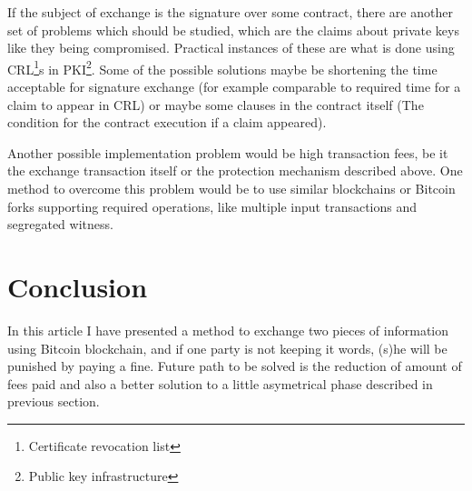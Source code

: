 \documentclass[]{article}
\begin{document}
If the subject of exchange is the signature over some contract, there are another set of problems which should be studied, which are the claims about private keys like they being compromised. Practical instances of these are what is done using CRL\footnote{Certificate revocation list}s in PKI\footnote{Public key infrastructure}. Some of the possible solutions maybe be shortening the time acceptable for signature exchange (for example comparable to required time for a claim to appear in CRL) or maybe some clauses in the contract itself (The condition for the contract execution if a claim appeared).

Another possible implementation problem would be high transaction fees, be it the exchange transaction itself or the protection mechanism described above. One method to overcome this problem would be to use similar blockchains or Bitcoin forks supporting required operations, like multiple input transactions and segregated witness.

\section{Conclusion}

In this article I have presented a method to exchange two pieces of information using Bitcoin blockchain, and if one party is not keeping it words, (s)he will be punished by paying a fine. Future path to be solved is the reduction of amount of fees paid and also a better solution to a little asymetrical phase described in previous section.
\end{document}
